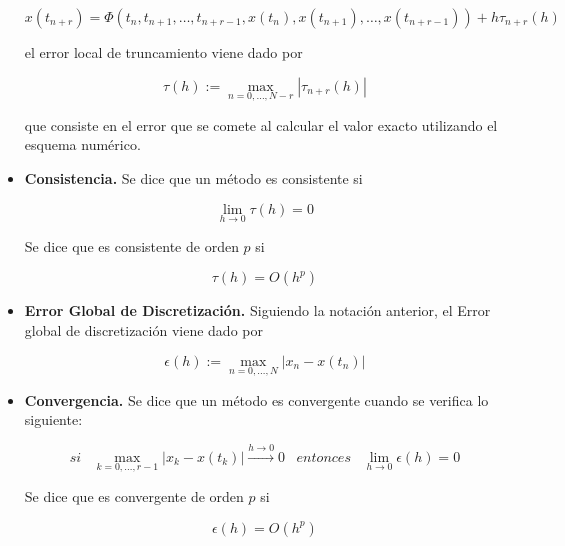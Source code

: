 \begin{itemize}
				\begin{equation}
						x(t_{n+r}) = \Phi (t_n,
						t_{n+1},\ldots,t_{n+r-1},x(t_n),x(t_{n+1}),\ldots,x(t_{n+r-1}))
						+ h\tau_{n+r}(h)
				\end{equation}

				el error local de truncamiento viene dado por

				\begin{equation}
						\tau (h) := \max_{n=0,\ldots,N-r}|\tau_{n+r}(h)|	
				\end{equation}

				que consiste en el error que se comete al calcular el valor
				exacto utilizando el esquema numérico.

		\item \textbf{Consistencia.} Se dice que un método es consistente si

				\begin{equation}
						\lim_{h\to 0} \tau(h) = 0	
				\end{equation}

				Se dice que es consistente de orden $p$ si

				\begin{equation}
					\tau(h) = O(h^p)				
				\end{equation}

		\item \textbf{Error Global de Discretización.} Siguiendo la notación
				anterior, el Error global de discretización viene dado por

				\begin{equation}
					\epsilon (h) := \max_{n=0,\ldots,N}|x_n - x(t_n)|
				\end{equation}

		\item \textbf{Convergencia.} Se dice que un método es convergente cuando
				se verifica lo siguiente:

				\begin{equation}
						si \;\;\; \max_{k=0,\ldots,r-1}|x_k - x(t_k)|
						\xrightarrow {h\to 0} 0	\;\;\; entonces \;\;\; \lim_{h\to
						0}\epsilon(h) = 0
				\end{equation}

				Se dice que es convergente de orden $p$ si

				\begin{equation}
						\epsilon(h) = O(h^p)	
				\end{equation}

\end{itemize}

